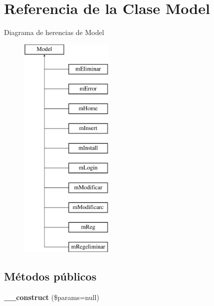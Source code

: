 \hypertarget{class_model}{}\section{Referencia de la Clase Model}
\label{class_model}
Diagrama de herencias de Model\begin{figure}[H]
\begin{center}
\leavevmode
\includegraphics[height=11.000000cm]{class_model}
\end{center}
\end{figure}
\subsection*{Métodos públicos}
\begin{DoxyCompactItemize}
\item 
\hypertarget{class_model_a05014738840640fff5d40cc0604cb5c9}{}{\bfseries \+\_\+\+\_\+construct} (\$params=null)\label{class_model_a05014738840640fff5d40cc0604cb5c9}

\end{DoxyCompactItemize}
